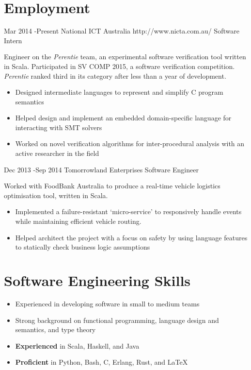 \documentclass[10pt]{article} %
\begin{document}
\section{Employment}

\job
{Mar 2014 -}{Present}
{National ICT Australia}
{http://www.nicta.com.au/}
{Software Intern}
{Engineer on the \textit{Perentie} team, an experimental software verification tool written in Scala. Participated in SV COMP 2015, a software verification competition. \textit{Perentie} ranked third in its category after less than a year of development.

\begin{itemize}
 \item{Designed intermediate languages to represent and simplify C program semantics}
 \item{Helped design and implement an embedded domain-specific language for interacting with SMT solvers}
 \item{Worked on novel verification algorithms for inter-procedural analysis with an active researcher in the field}
\end{itemize}
}

\newpage

\job
{Dec 2013 -}{Sep 2014}
{Tomorrowland Enterprises}
{}
{Software Engineer}
{Worked with FoodBank Australia to produce a real-time vehicle logistics optimisation tool, written in Scala.

\begin{itemize} 
 \item{Implemented a failure-resistant `micro-service' to responsively handle events while maintaining efficient vehicle routing.}
 \item{Helped architect the project with a focus on safety by using language features to statically check business logic assumptions} 
\end{itemize}
}


\section{Software Engineering Skills}

\begin{itemize}
\item{Experienced in developing software in small to medium teams}

\item{Strong background on functional programming, language design and semantics, and type theory}

\item{\textbf{Experienced} in Scala, Haskell, and Java}

\item{\textbf{Proficient} in Python, Bash, C, Erlang, Rust, and \LaTeX}

\end{itemize}

\end{document}
